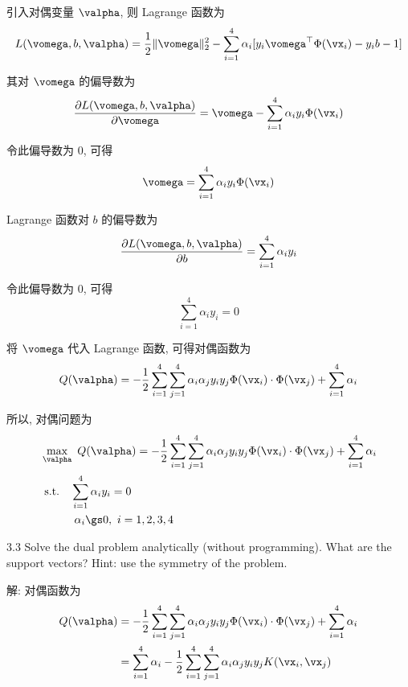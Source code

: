 \documentclass[openany]{ctexbook}
\theoremstyle{kaiti}
\theoremstyle{normal}
\begin{document}
引入对偶变量 $\valpha$, 则 Lagrange 函数为
\begin{equation}
  L(\vomega,b,\valpha)=\frac{1}{2}\|\vomega\|_2^2-\sum_{i=1}^4\alpha_i[y_i\vomega^{\top}\Phi(\vx_i)-y_ib-1]
\end{equation}

其对 $\vomega$ 的偏导数为
\begin{equation}
  \frac{\partial L(\vomega,b,\valpha)}{\partial\vomega}=\vomega-\sum_{i=1}^4\alpha_iy_i\Phi(\vx_i)
\end{equation}

令此偏导数为 0, 可得
\begin{equation}
  \vomega=\sum_{i=1}^4\alpha_iy_i\Phi(\vx_i)
\end{equation}

Lagrange 函数对 $b$ 的偏导数为
\begin{equation}
  \frac{\partial L(\vomega,b,\valpha)}{\partial b}=\sum_{i=1}^4\alpha_iy_i
\end{equation}

令此偏导数为 0, 可得
\begin{equation}
  \sum_{i=1}^4\alpha_iy_i=0
\end{equation}

将 $\vomega$ 代入 Lagrange 函数, 可得对偶函数为
\begin{equation}
  Q(\valpha)=-\frac{1}{2}\sum_{i=1}^4\sum_{j=1}^4\alpha_i\alpha_jy_iy_j\Phi(\vx_i)\cdot\Phi(\vx_j)+\sum_{i=1}^4\alpha_i
\end{equation}

所以, 对偶问题为
\begin{equation}
  \begin{aligned}
    &\max_{\valpha}~Q(\valpha)=-\frac{1}{2}\sum_{i=1}^4\sum_{j=1}^4\alpha_i\alpha_jy_iy_j\Phi(\vx_i)\cdot\Phi(\vx_j)+\sum_{i=1}^4\alpha_i\\
    &~\mathrm{s.t.}\quad\sum_{i=1}^4\alpha_iy_i=0\\
    &\quad\quad~~~\alpha_i\gs0,~i=1,2,3,4
  \end{aligned}
\end{equation}

3.3 Solve the dual problem analytically (without programming). What are the support vectors? Hint: use the symmetry of the problem.

解: 对偶函数为
\begin{equation}
  \begin{aligned}
    Q(\valpha)
    &=-\frac{1}{2}\sum_{i=1}^4\sum_{j=1}^4\alpha_i\alpha_jy_iy_j\Phi(\vx_i)\cdot\Phi(\vx_j)+\sum_{i=1}^4\alpha_i\\
    &=\sum_{i=1}^4\alpha_i-\frac{1}{2}\sum_{i=1}^4\sum_{j=1}^4\alpha_i\alpha_jy_iy_jK(\vx_i,\vx_j)\\
  \end{aligned}
\end{equation}
\end{document}
